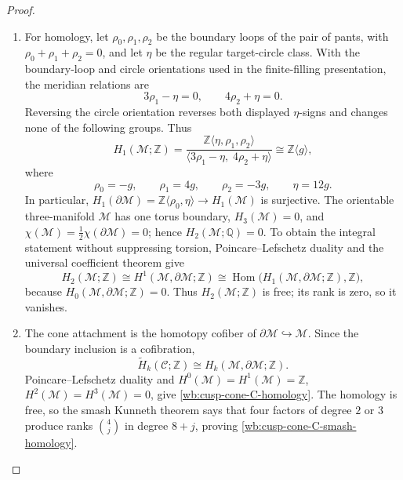 \begin{proof}
\begin{enumerate}[label=\arabic*.,leftmargin=*]
\item For homology, let \(\rho_0,\rho_1,\rho_2\) be the boundary loops of the pair
of pants, with \(\rho_0+\rho_1+\rho_2=0\), and let \(\eta\) be the regular
target-circle class.  With the boundary-loop and circle orientations used
in the finite-filling presentation, the meridian relations are
\begin{equation}
 3\rho_1-\eta=0,\qquad4\rho_2+\eta=0.
 \label{wb:cusp-cone-Seifert-meridians}
\end{equation}
Reversing the circle orientation reverses both displayed \(\eta\)-signs
and changes none of the following groups.  Thus
\begin{equation}
 H_1(\mathcal M;\mathbb Z)
 =\frac{\mathbb Z\langle\eta,\rho_1,\rho_2\rangle}
 {\langle3\rho_1-\eta,\;4\rho_2+\eta\rangle}
 \cong\mathbb Z\langle g\rangle,
 \label{wb:cusp-cone-M-H1}
\end{equation}
where
\begin{equation}
 \rho_0=-g,\qquad\rho_1=4g,\qquad
 \rho_2=-3g,\qquad\eta=12g.
 \label{wb:cusp-cone-M-boundary-map}
\end{equation}
In particular,
\(H_1(\partial\mathcal M)=\mathbb Z\langle\rho_0,\eta\rangle
\to H_1(\mathcal M)\) is surjective.  The orientable three-manifold
\(\mathcal M\) has one torus boundary, \(H_3(\mathcal M)=0\), and
\(\chi(\mathcal M)=\frac12\chi(\partial\mathcal M)=0\); hence
\(H_2(\mathcal M;\mathbb Q)=0\).  To obtain the integral statement without
suppressing torsion, Poincare--Lefschetz duality and the universal
coefficient theorem give
\[
 H_2(\mathcal M;\mathbb Z)
 \cong H^1(\mathcal M,\partial\mathcal M;\mathbb Z)
 \cong \operatorname{Hom}
 \bigl(H_1(\mathcal M,\partial\mathcal M;\mathbb Z),\mathbb Z\bigr),
\]
because \(H_0(\mathcal M,\partial\mathcal M;\mathbb Z)=0\).  Thus
\(H_2(\mathcal M;\mathbb Z)\) is free; its rank is zero, so it vanishes.

\item The cone attachment is the homotopy cofiber of
\(\partial\mathcal M\hookrightarrow\mathcal M\).  Since the boundary
inclusion is a cofibration,
\[
 \widetilde H_k(\mathcal C;\mathbb Z)
 \cong H_k(\mathcal M,\partial\mathcal M;\mathbb Z).
\]
Poincare--Lefschetz duality and
\(H^0(\mathcal M)=H^1(\mathcal M)=\mathbb Z\),
\(H^2(\mathcal M)=H^3(\mathcal M)=0\), give
\cref{wb:cusp-cone-C-homology}.  The homology is free, so the smash Kunneth
theorem says that four factors of degree \(2\) or \(3\) produce ranks
\(\binom4j\) in degree \(8+j\), proving
\cref{wb:cusp-cone-C-smash-homology}.
\end{enumerate}
\end{proof}

